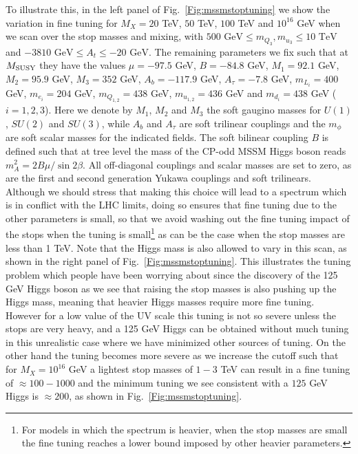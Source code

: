 \documentclass[preprint,amsmath,amssymb,aps,superscriptaddress,prd,
showpacs,floatfix,nofootinbib]{revtex4-1}
\begin{document}
To illustrate this, in the left panel of Fig.~\ref{Fig:mssmstoptuning}
we show the variation in fine tuning for $M_X = 20$ TeV, $50$ TeV, $100$
TeV and $10^{16}$ GeV when we scan over the stop masses and mixing,
with $500 \textrm{ GeV} \leq m_{Q_3} , m_{u_3} \leq 10 \textrm{ TeV}$ and
$-3810\textrm{ GeV} \leq A_t \leq -20 \textrm{ GeV}$.  The remaining
parameters we fix such that at $M_{\rm SUSY}$ they have the values
$\mu = -97.5$ GeV, $B = -84.8$ GeV, $M_1 = 92.1$ GeV, $M_2 = 95.9$ GeV,
$M_3 = 352$ GeV, $A_b = -117.9$ GeV, $A_\tau = -7.8$ GeV, $m_{L_i} = 400$ GeV,
$m_{e_i} = 204$ GeV, $m_{Q_{1,2}} = 438$ GeV, $m_{u_{1,2}} = 436$ GeV and
$m_{d_i} = 438$ GeV ($i = 1 , 2 , 3$).  Here we denote by $M_1$, $M_2$ and
$M_3$ the soft gaugino masses for $U(1)$, $SU(2)$ and $SU(3)$, while $A_b$ and
$A_\tau$ are soft trilinear couplings and the $m_\phi$ are soft scalar
masses for the indicated fields.  The soft bilinear coupling $B$ is defined
such that at tree level the mass of the CP-odd MSSM Higgs boson reads
$m_A^2 = 2 B \mu / \sin 2\beta$.  All off-diagonal couplings and scalar masses
are set to zero, as are the first and second generation Yukawa couplings
and soft trilinears.  Although we should stress that making
this choice will lead to a spectrum which is in conflict with the LHC
limits, doing so ensures that fine tuning due to the other parameters
is small, so that we avoid washing out the fine tuning impact of the
stops when the tuning is small\footnote{For models in which the
spectrum is heavier, when the stop masses are small the fine tuning
reaches a lower bound imposed by other heavier parameters.} as can
be the case when the stop masses are less than 1 TeV.  Note that the
Higgs mass is also allowed to vary in this scan, as shown in the right
panel of Fig.~\ref{Fig:mssmstoptuning}.  This illustrates the tuning
problem which people have been worrying about since the discovery of
the 125 GeV Higgs boson as we see that raising the stop masses is also
pushing up the Higgs mass, meaning that heavier Higgs masses require
more fine tuning.  However for a low value of the UV scale this tuning
is not so severe unless the stops are very heavy, and a 125 GeV Higgs
can be obtained without much tuning in this unrealistic case where we
have minimized other sources of tuning.  On the other hand the tuning
becomes more severe as we increase the cutoff such that for $M_X =
10^{16}$ GeV a lightest stop masses of $1-3$ TeV can result in a fine
tuning of $\approx 100 - 1000$ and the minimum tuning we see
consistent with a $125$ GeV Higgs is $\approx 200$, as shown in
Fig.~\ref{Fig:mssmstoptuning}.
\end{document}
